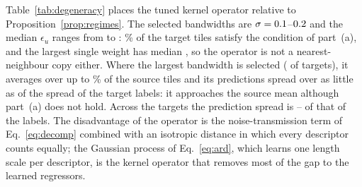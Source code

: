 \begin{table}[!tp]
\centering
\caption{Hyper-parameters selected by the inner leave-one-training-city-out
loop of each split. $N$: training tiles; $\sigma$: kernel bandwidth; $k$:
neighbours; epochs and rounds: median best iteration over the inner folds
(GBDT: for $\gamma$); link model: rounds of the regressor and of the hurdle
classifier.}
\label{tab:hparams}
\small\setlength{\tabcolsep}{3pt}
%
\end{table}

Table~\ref{tab:degeneracy} places the tuned kernel operator relative to
Proposition~\ref{prop:regimes}. The selected bandwidths are
$\sigma=0.1$--$0.2$ and the median $\epsilon_u$ ranges from
\epsMedianMin{} to \epsMedianMax: \fracEpsRegime\% of the target tiles
satisfy the condition of part~(a), and the largest single weight has median
\wmaxMedian, so the operator is not a nearest-neighbour copy either. Where
the largest bandwidth is selected (\nSigmaLargest{} of \nFolds{} targets),
it averages over up to \neffFracMax\% of the source tiles and its
predictions spread over as little as \spreadMin{} of the spread of the
target labels: it approaches the source mean although part~(a) does not
hold. Across the targets the prediction spread is
\spreadMin--\spreadMax{} of that of the labels. The disadvantage of the
operator is the noise-transmission term of Eq.~\eqref{eq:decomp} combined
with an isotropic distance in which every descriptor counts equally; the
Gaussian process of Eq.~\eqref{eq:ard}, which learns one length scale per
descriptor, is the kernel operator that removes most of the gap to the
learned regressors.

\begin{table}[!tp]
\centering
\caption{Kernel transfer on each held-out city: selected bandwidth; median
$\epsilon_u=D_u/2\sigma^2$ and share of tiles with $\epsilon_u<1$
(Proposition~\ref{prop:regimes}a); median effective-neighbourhood fraction;
median largest weight (Proposition~\ref{prop:regimes}b); standard deviation
of the predictions over that of the labels.}
\label{tab:degeneracy}
\small\setlength{\tabcolsep}{2.5pt}
%
\end{table}

